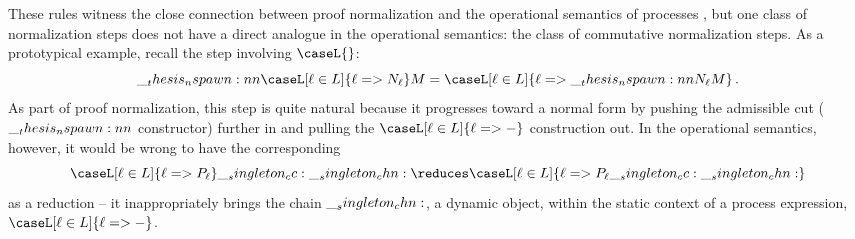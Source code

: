 

These rules witness the close connection between proof normalization and the operational semantics of processes%
, but one class of normalization steps does not have a direct analogue in the operational semantics: the class of commutative normalization steps.
As a prototypical example, recall the step involving $\caseL{}$:
\begin{equation*}
  \nspawn{\caseL[\ell \in L]{\ell => N_{\ell}}}{M} = \caseL[\ell \in L]{\ell => \nspawn{N_{\ell}}{M}}
  \,.
\end{equation*}
As part of proof normalization, this step is quite natural because it progresses toward a normal form by pushing the admissible cut ($\nspawn{}{}$ constructor) further in and pulling the $\caseL[\ell \in L]{\ell => {-}}$ construction out.
In the operational semantics, however, it would be wrong to have the corresponding
\begin{equation*}
  \caseL[\ell \in L]{\ell => P_{\ell}} \cc \chn \reduces \caseL[\ell \in L]{\ell => P_{\ell} \cc \chn}
\end{equation*}
as a reduction -- it inappropriately brings the chain $\__singleton_chn:$, a dynamic object, within the static context of a process expression, $\caseL[\ell \in L]{\ell => {-}}$.

